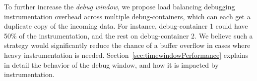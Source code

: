 To further increase the \emph{debug window}, we propose load balancing debugging instrumentation overhead across multiple debug-containers, which can each get a duplicate copy of the incoming data. 
For instance, debug-container 1 could have 50\% of the instrumentation, and the rest on debug-container 2.
We believe such a strategy would significantly reduce the chance of a buffer overflow in cases where heavy instrumentation is needed.
Section~\ref{sec:timewindowPerformance} explains in detail the behavior of the debug window, and how it is impacted by instrumentation.
